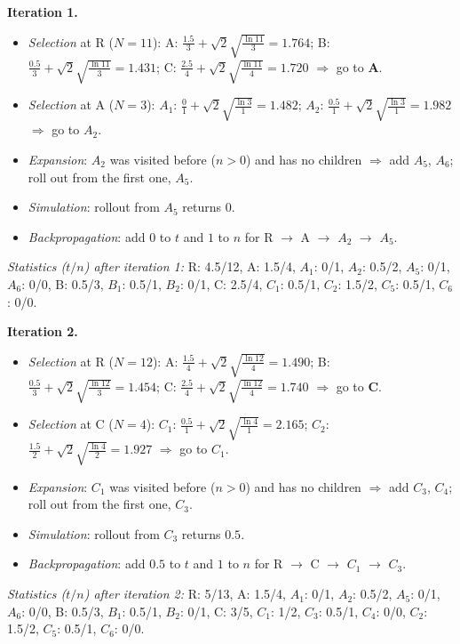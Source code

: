\documentclass[11pt,a4paper]{article}
\begin{document}
\begin{solbox}
\textbf{Iteration 1.}
\begin{itemize}[leftmargin=1.5em,itemsep=1pt]
\item \emph{Selection} at R ($N=11$): A: $\frac{1.5}{3} + \sqrt2\sqrt{\frac{\ln 11}{3}} = 1.764$; B: $\frac{0.5}{3} + \sqrt2\sqrt{\frac{\ln 11}{3}} = 1.431$; C: $\frac{2.5}{4} + \sqrt2\sqrt{\frac{\ln 11}{4}} = 1.720$ $\Rightarrow$ go to \textbf{A}.
\item \emph{Selection} at A ($N=3$): $A_{1}$: $\frac{0}{1} + \sqrt2\sqrt{\frac{\ln 3}{1}} = 1.482$; $A_{2}$: $\frac{0.5}{1} + \sqrt2\sqrt{\frac{\ln 3}{1}} = 1.982$ $\Rightarrow$ go to \textbf{$A_{2}$}.
\item \emph{Expansion}: $A_{2}$ was visited before ($n>0$) and has no children $\Rightarrow$ add $A_{5}$, $A_{6}$; roll out from the first one, \textbf{$A_{5}$}.
\item \emph{Simulation}: rollout from $A_{5}$ returns $0$.
\item \emph{Backpropagation}: add $0$ to $t$ and $1$ to $n$ for R $\to$ A $\to$ $A_{2}$ $\to$ $A_{5}$.
\end{itemize}
\textit{Statistics ($t/n$) after iteration 1:} R: 4.5/12, A: 1.5/4, $A_{1}$: 0/1, $A_{2}$: 0.5/2, $A_{5}$: 0/1, $A_{6}$: 0/0, B: 0.5/3, $B_{1}$: 0.5/1, $B_{2}$: 0/1, C: 2.5/4, $C_{1}$: 0.5/1, $C_{2}$: 1.5/2, $C_{5}$: 0.5/1, $C_{6}$: 0/0.

\smallskip
\textbf{Iteration 2.}
\begin{itemize}[leftmargin=1.5em,itemsep=1pt]
\item \emph{Selection} at R ($N=12$): A: $\frac{1.5}{4} + \sqrt2\sqrt{\frac{\ln 12}{4}} = 1.490$; B: $\frac{0.5}{3} + \sqrt2\sqrt{\frac{\ln 12}{3}} = 1.454$; C: $\frac{2.5}{4} + \sqrt2\sqrt{\frac{\ln 12}{4}} = 1.740$ $\Rightarrow$ go to \textbf{C}.
\item \emph{Selection} at C ($N=4$): $C_{1}$: $\frac{0.5}{1} + \sqrt2\sqrt{\frac{\ln 4}{1}} = 2.165$; $C_{2}$: $\frac{1.5}{2} + \sqrt2\sqrt{\frac{\ln 4}{2}} = 1.927$ $\Rightarrow$ go to \textbf{$C_{1}$}.
\item \emph{Expansion}: $C_{1}$ was visited before ($n>0$) and has no children $\Rightarrow$ add $C_{3}$, $C_{4}$; roll out from the first one, \textbf{$C_{3}$}.
\item \emph{Simulation}: rollout from $C_{3}$ returns $0.5$.
\item \emph{Backpropagation}: add $0.5$ to $t$ and $1$ to $n$ for R $\to$ C $\to$ $C_{1}$ $\to$ $C_{3}$.
\end{itemize}
\textit{Statistics ($t/n$) after iteration 2:} R: 5/13, A: 1.5/4, $A_{1}$: 0/1, $A_{2}$: 0.5/2, $A_{5}$: 0/1, $A_{6}$: 0/0, B: 0.5/3, $B_{1}$: 0.5/1, $B_{2}$: 0/1, C: 3/5, $C_{1}$: 1/2, $C_{3}$: 0.5/1, $C_{4}$: 0/0, $C_{2}$: 1.5/2, $C_{5}$: 0.5/1, $C_{6}$: 0/0.


\end{solbox}
\end{document}
